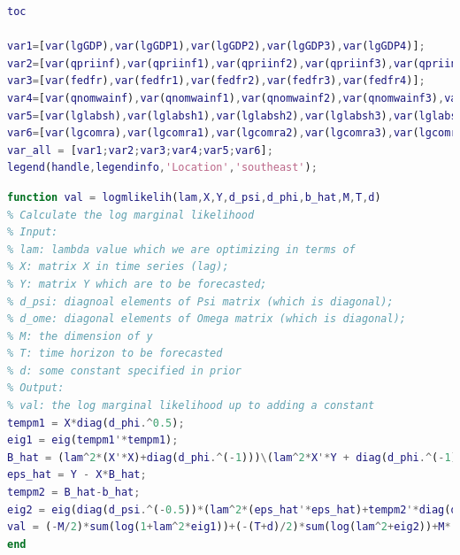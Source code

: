 \documentclass[11pt, oneside]{article}   	%
\begin{document}
\begin{lstlisting}[language=Matlab ,caption={Matlab code for problem 2.}, label={code:prob2}]
toc

var1=[var(lgGDP),var(lgGDP1),var(lgGDP2),var(lgGDP3),var(lgGDP4)];
var2=[var(qpriinf),var(qpriinf1),var(qpriinf2),var(qpriinf3),var(qpriinf4)];
var3=[var(fedfr),var(fedfr1),var(fedfr2),var(fedfr3),var(fedfr4)];
var4=[var(qnomwainf),var(qnomwainf1),var(qnomwainf2),var(qnomwainf3),var(qnomwainf4)];
var5=[var(lglabsh),var(lglabsh1),var(lglabsh2),var(lglabsh3),var(lglabsh4)];
var6=[var(lgcomra),var(lgcomra1),var(lgcomra2),var(lgcomra3),var(lgcomra4)];
var_all = [var1;var2;var3;var4;var5;var6];
legend(handle,legendinfo,'Location','southeast');
\end{lstlisting}

\begin{lstlisting}[language=Matlab ,caption={Matlab code for evaluate the log marginal likelihood.}, label={code:lgML}]
function val = logmlikelih(lam,X,Y,d_psi,d_phi,b_hat,M,T,d)
% Calculate the log marginal likelihood
% Input:
% lam: lambda value which we are optimizing in terms of
% X: matrix X in time series (lag);
% Y: matrix Y which are to be forecasted;
% d_psi: diagnoal elements of Psi matrix (which is diagonal);
% d_ome: diagonal elements of Omega matrix (which is diagonal);
% M: the dimension of y
% T: time horizon to be forecasted
% d: some constant specified in prior
% Output:
% val: the log marginal likelihood up to adding a constant
tempm1 = X*diag(d_phi.^0.5);    
eig1 = eig(tempm1'*tempm1);
B_hat = (lam^2*(X'*X)+diag(d_phi.^(-1)))\(lam^2*X'*Y + diag(d_phi.^(-1))*b_hat);
eps_hat = Y - X*B_hat;
tempm2 = B_hat-b_hat;
eig2 = eig(diag(d_psi.^(-0.5))*(lam^2*(eps_hat'*eps_hat)+tempm2'*diag(d_phi.^(-1))*tempm2)*diag(d_psi.^(-0.5)));
val = (-M/2)*sum(log(1+lam^2*eig1))+(-(T+d)/2)*sum(log(lam^2+eig2))+M*(T+d)*log(lam);
end
\end{lstlisting}
\end{document}
